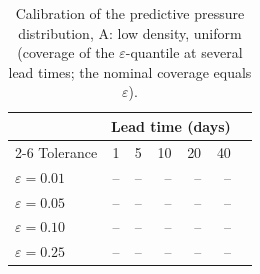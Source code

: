 \begin{table}[htbp]
\centering
\caption{Calibration of the predictive pressure distribution, A: low density, uniform
(coverage of the $\varepsilon$-quantile at several lead times; the nominal
coverage equals $\varepsilon$).}
\label{tab:ch6-calibration-A}
\begin{tabular}{@{}lrrrrrr@{}}
\toprule
& \multicolumn{5}{c}{Lead time (days)} \\
\cmidrule(r){2-6}
Tolerance & 1 & 5 & 10 & 20 & 40 \\
\midrule

$\varepsilon=0.01$ & -- & -- & -- & -- & -- \\
$\varepsilon=0.05$ & -- & -- & -- & -- & -- \\
$\varepsilon=0.10$ & -- & -- & -- & -- & -- \\
$\varepsilon=0.25$ & -- & -- & -- & -- & -- \\
\bottomrule
\end{tabular}
\end{table}
